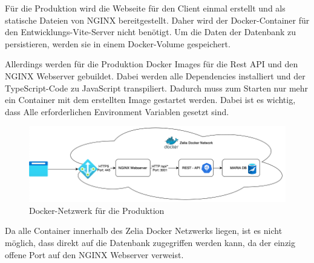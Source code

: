 
Für die Produktion wird die Webseite für den Client einmal erstellt und als statische Dateien von NGINX bereitgestellt. Daher wird der Docker-Container für den Entwicklungs-Vite-Server nicht benötigt. Um die Daten der Datenbank zu persistieren, werden sie in einem Docker-Volume gespeichert. 

Allerdings werden für die Produktion Docker Images für die Rest API und den NGINX Webserver gebuildet. Dabei werden alle Dependencies installiert und der TypeScript-Code zu JavaScript transpiliert. Dadurch muss zum Starten nur mehr ein Container mit dem erstellten Image gestartet werden. Dabei ist es wichtig, dass Alle erforderlichen Environment Variablen gesetzt sind.

\begin{figure}[H]
    \centering
    \includegraphics{media/Docker/ProdNetwork.png}
    \caption{Docker-Netzwerk für die Produktion}
\end{figure}

Da alle Container innerhalb des Zelia Docker Netzwerks liegen, ist es nicht möglich, dass direkt auf die Datenbank zugegriffen werden kann, da der einzig offene Port auf den NGINX Webserver verweist. 


